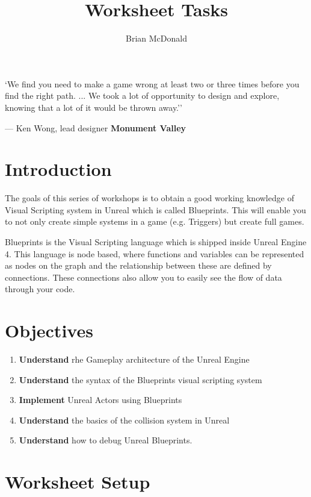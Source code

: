 \documentclass{../../../fal_assignment}
\title{Worksheet Tasks}
\author{Brian McDonald} %
\begin{document}
\maketitle

\begin{marginquote}
`We find you need to make a game wrong at least two or three times before you find the right path. ...
We took a lot of opportunity to design and explore, knowing that a lot of it would be thrown away.''
\par --- Ken Wong, lead designer \textbf{Monument Valley}
\end{marginquote}


\section*{Introduction}
The goals of this series of workshops is to obtain a good working knowledge of Visual Scripting system in Unreal which is called Blueprints. This will enable you to not only create simple systems in a game (e.g. Triggers) but create full games.

Blueprints is the Visual Scripting language which is shipped inside Unreal Engine 4. This language is node based, where functions and variables can be represented as nodes on the graph and the relationship between these are defined by connections. These connections also allow you to easily see the flow of data through your code.

\section*{Objectives}
\begin{enumerate}[label=(\Alph*)]
	\item \textbf{Understand} rhe Gameplay architecture of the Unreal Engine
	\item \textbf{Understand} the syntax of the Blueprints visual scripting system
	\item \textbf{Implement} Unreal Actors using Blueprints
  \item \textbf{Understand} the basics of the collision system in Unreal
  \item \textbf{Understand} how to debug Unreal Blueprints.
\end{enumerate}

\section*{Worksheet Setup}
\end{document}
